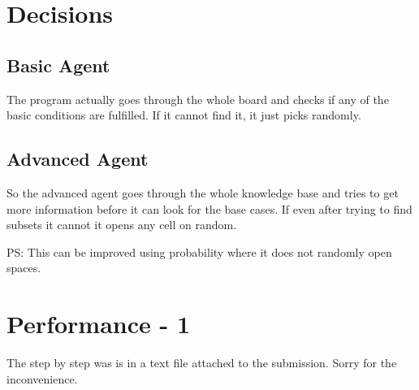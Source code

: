 \documentclass[11pt]{scrartcl} %
\begin{document}
\section{Decisions}
\subsection{Basic Agent}
The program actually goes through the whole board and checks if any of the basic conditions are fulfilled. If it cannot find it, it just picks randomly.
\subsection{Advanced Agent}
So the advanced agent goes through the whole knowledge base and tries to get more information before it can look for the base cases. If even after trying to find subsets it cannot it opens any cell on random. 

PS: This can be improved using probability where it does not randomly open spaces. 
\section{Performance - 1}
The step by step was is in a text file attached to the submission. Sorry for the inconvenience. 
\end{document}
